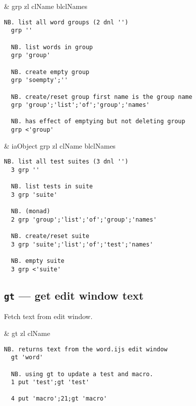 \begin{wordhead}
\monad & grp zl \argsep clName \argsep blclNames \\
\end{wordhead}
\begin{lstlisting}[frame=single,framerule=0pt] 
  NB. list all word groups (2 dnl '')
  grp ''    
  
  NB. list words in group    
  grp 'group'  
  
  NB. create empty group 
  grp 'soempty';''

  NB. create/reset group first name is the group name
  grp 'group';'list';'of';'group';'names'

  NB. has effect of emptying but not deleting group 
  grp <'group' 
\end{lstlisting}

\begin{wordhead}
\dyad & iaObject grp zl \argsep clName \argsep blclNames \\
\end{wordhead}
\begin{lstlisting}[frame=single,framerule=0pt] 
  NB. list all test suites (3 dnl '')
  3 grp ''  
  
  NB. list tests in suite   
  3 grp 'suite' 
  
  NB. (monad)
  2 grp 'group';'list';'of';'group';'names'  
  
  NB. create/reset suite
  3 grp 'suite';'list';'of';'test';'names'  
  
  NB. empty suite  
  3 grp <'suite' 
\end{lstlisting}


\subsection{\texttt{gt} --- get edit window text} 

Fetch text from edit window.

\begin{wordhead}
\monad & gt zl \argsep clName \\
\end{wordhead}
\begin{lstlisting}[frame=single,framerule=0pt] 
  NB. returns text from the word.ijs edit window
  gt 'word'  

  NB. using gt to update a test and macro.
  1 put 'test';gt 'test' 

  4 put 'macro';21;gt 'macro' 
\end{lstlisting}


